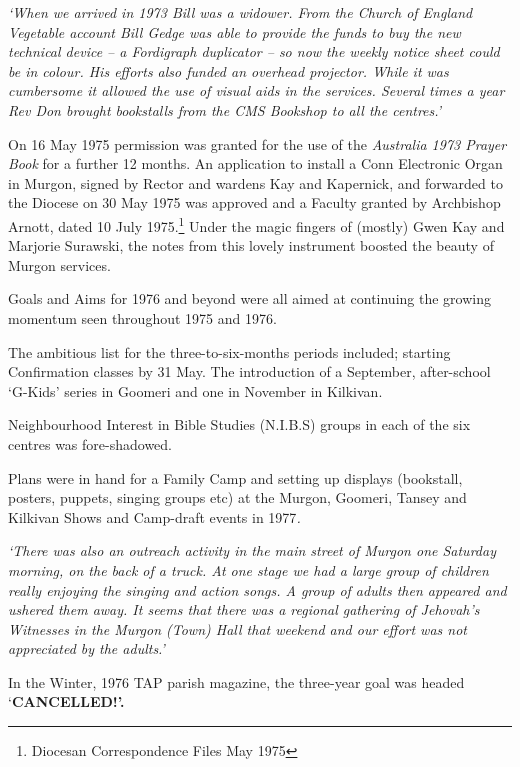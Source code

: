 \emph{`When we arrived in 1973 Bill was a widower. From the Church of England Vegetable account Bill Gedge was able to provide the funds to buy the new technical device -- a Fordigraph duplicator -- so now the weekly notice sheet could be in colour. His efforts also funded an overhead projector. While it was cumbersome it allowed the use of visual aids in the services. Several times a year Rev Don brought bookstalls from the CMS Bookshop to all the centres.'}



On 16 May 1975 permission was granted for the use of the \emph{Australia 1973 Prayer Book} for a further 12 months. An application to install a Conn Electronic Organ in Murgon, signed by Rector and wardens Kay and Kapernick, and forwarded to the Diocese on 30 May 1975 was approved and a Faculty granted by Archbishop Arnott, dated 10 July 1975.\footnote{Diocesan Correspondence Files May 1975} Under the magic fingers of (mostly) Gwen Kay and Marjorie Surawski, the notes from this lovely instrument boosted the beauty of Murgon services.


Goals and Aims for 1976 and beyond were all aimed at continuing the growing momentum seen throughout 1975 and 1976.



The ambitious list for the three-to-six-months periods included; starting Confirmation classes by 31 May. The introduction of a September, after-school `G-Kids' series in Goomeri and one in November in Kilkivan.



Neighbourhood Interest in Bible Studies (N.I.B.S) groups in each of the six centres was fore-shadowed.



Plans were in hand for a Family Camp and setting up displays (bookstall, posters, puppets, singing groups etc) at the Murgon, Goomeri, Tansey and Kilkivan Shows and Camp-draft events in 1977\emph{.}



\emph{`There was also an outreach activity in the main street of Murgon one Saturday morning, on the back of a truck. At one stage we had a large group of children really enjoying the singing and action songs. A group of adults then appeared and ushered them away. It seems that there was a regional gathering of Jehovah's Witnesses in the Murgon (Town) Hall that weekend and our effort was not appreciated by the adults.'}



In the Winter, 1976 TAP parish magazine, the three-year goal was headed `\textbf{CANCELLED!'.}



